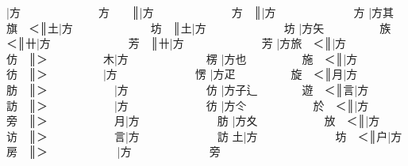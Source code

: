 {\cjk{}{\cnsym{}　　　　　　}}|{\cjk{}方{\cnsym{}　　　　　　　}方{\cnsym{}　　}}║{\cjk{}{\cnsym{}　　　　　　　}}|{\cjk{}方{\cnsym{}　　　　　　　}方{\cnsym{}　}}║{\cjk{}{\cnsym{}　　　　　　　　}}|{\cjk{}方{\cnsym{}　　　　　　　}方} 
{\cjk{}{\cnsym{}　　　　　　}}|{\cjk{}方其{\cnsym{}　　　　　}旗{\cnsym{}　}＜}║{\cjk{}{\cnsym{}　　　　　　}土}|{\cjk{}方{\cnsym{}　　　　　　　}坊{\cnsym{}　}}║{\cjk{}{\cnsym{}　　　　　　　}土}|{\cjk{}方{\cnsym{}　　　　　　　}坊} 
{\cjk{}{\cnsym{}　　　　　　}}|{\cjk{}方矢{\cnsym{}　　　　　}族{\cnsym{}　}＜}║{\cjk{}{\cnsym{}　　　　　　}卄}|{\cjk{}方{\cnsym{}　　　　　　　}芳{\cnsym{}　}}║{\cjk{}{\cnsym{}　　　　　　　}卄}|{\cjk{}方{\cnsym{}　　　　　　　}芳} 
{\cjk{}{\cnsym{}　　　　　　}}|{\cjk{}方旅{\cnsym{}　}＜}║{\cjk{}{\cnsym{}　　　　　　}}|{\cjk{}方{\cnsym{}　　　　　　　}仿{\cnsym{}　}}║{\cjk{}＞{\cnsym{}　　　　　}木}|{\cjk{}方{\cnsym{}　　　　　　　}楞} 
{\cjk{}{\cnsym{}　　　　　　}}|{\cjk{}方也{\cnsym{}　　　　　}施{\cnsym{}　}＜}║{\cjk{}{\cnsym{}　　　　　　}}|{\cjk{}方{\cnsym{}　　　　　　　}彷{\cnsym{}　}}║{\cjk{}＞{\cnsym{}　　　　　}}|{\cjk{}方{\cnsym{}　　　　　　　}愣} 
{\cjk{}{\cnsym{}　　　　　　}}|{\cjk{}方疋{\cnsym{}　　　　　}旋{\cnsym{}　}＜}║{\cjk{}{\cnsym{}　　　　　　}月}|{\cjk{}方{\cnsym{}　　　　　　　}肪{\cnsym{}　}}║{\cjk{}＞{\cnsym{}　　　　　　}}|{\cjk{}方{\cnsym{}　　　　　　　}仿} 
{\cjk{}{\cnsym{}　　　　　　}}|{\cjk{}方子辶{\cnsym{}　　　　}遊{\cnsym{}　}＜}║{\cjk{}{\cnsym{}　　　　　　}言}|{\cjk{}方{\cnsym{}　　　　　　　}訪{\cnsym{}　}}║{\cjk{}＞{\cnsym{}　　　　　　}}|{\cjk{}方{\cnsym{}　　　　　　　}彷} 
{\cjk{}{\cnsym{}　　　　　　}}|{\cjk{}方仒{\cnsym{}　　　　　　}於{\cnsym{}　}＜}║{}|{\cjk{}方{\cnsym{}　　　　　　　}旁{\cnsym{}　}}║{\cjk{}＞{\cnsym{}　　　　　　}月}|{\cjk{}方{\cnsym{}　　　　　　　}肪} 
{\cjk{}{\cnsym{}　　　　　　}}|{\cjk{}方夊{\cnsym{}　　　　　　}放{\cnsym{}　}＜}║{\cjk{}{\cnsym{}　　　　　　}}|{\cjk{}方{\cnsym{}　　　　　　　}访{\cnsym{}　}}║{\cjk{}＞{\cnsym{}　　　　　　}言}|{\cjk{}方{\cnsym{}　　　　　　　}訪} 
{\cjk{}{\cnsym{}　　　　　}土}|{\cjk{}方{\cnsym{}　　　　　　　}坊{\cnsym{}　}＜}║{\cjk{}{\cnsym{}　　　　　　}户}|{\cjk{}方{\cnsym{}　　　　　　　}房{\cnsym{}　}}║{\cjk{}＞{\cnsym{}　　　　　　}{\cnjzr{}}}|{\cjk{}方{\cnsym{}　　　　　　　}旁} 
